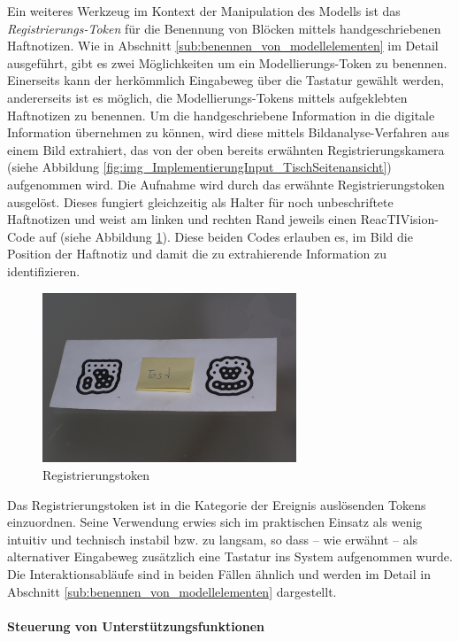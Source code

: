 Ein weiteres Werkzeug im Kontext der Manipulation des Modells ist das \emph{Registrierungs-Token} für die Benennung von Blöcken mittels handgeschriebenen Haftnotizen. Wie in Abschnitt \ref{sub:benennen_von_modellelementen} im Detail ausgeführt, gibt es zwei Möglichkeiten um ein Modellierungs-Token zu benennen. Einerseits kann der herkömmlich Eingabeweg über die Tastatur gewählt werden, andererseits ist es möglich, die Modellierungs-Tokens mittels aufgeklebten Haftnotizen zu benennen. Um die handgeschriebene Information in die digitale Information übernehmen zu können, wird diese mittels Bildanalyse-Verfahren aus einem Bild extrahiert, das von der oben bereits erwähnten Registrierungskamera (siehe Abbildung \ref{fig:img_ImplementierungInput_TischSeitenansicht}) aufgenommen wird. Die Aufnahme wird durch das erwähnte Registrierungstoken ausgelöst. Dieses fungiert gleichzeitig als Halter für noch unbeschriftete Haftnotizen und weist am linken und rechten Rand jeweils einen ReacTIVision-Code auf (siehe Abbildung \ref{fig:img_SystemNeu_Benennungstoken}). Diese beiden Codes erlauben es, im Bild die Position der Haftnotiz und damit die zu extrahierende Information zu identifizieren. 

\begin{figure}[htbp]
	\centering
		\includegraphics[height=2in]{img/SystemNeu/Benennungstoken.jpg}
	\caption{Registrierungstoken}
	\label{fig:img_SystemNeu_Benennungstoken}
\end{figure}

Das Registrierungstoken ist in die Kategorie der Ereignis auslösenden Tokens einzuordnen. Seine Verwendung erwies sich im praktischen Einsatz als wenig intuitiv und technisch instabil bzw. zu langsam, so dass -- wie erwähnt -- als alternativer Eingabeweg zusätzlich eine Tastatur ins System aufgenommen wurde. Die Interaktionsabläufe sind in beiden Fällen ähnlich und werden im Detail in Abschnitt \ref{sub:benennen_von_modellelementen} dargestellt.

\paragraph{Steuerung von Unterstützungsfunktionen} %
\label{par:steuerung_von_unterstützungsfunktionen}

